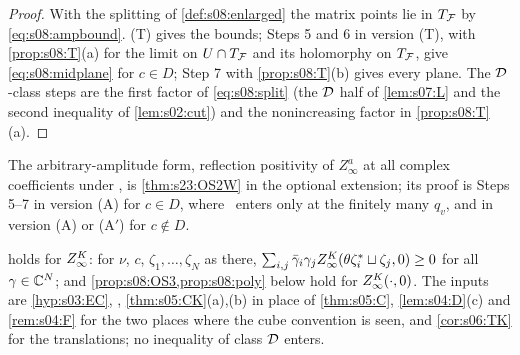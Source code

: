 \begin{proof}
With the splitting of \cref{def:s08:enlarged} the matrix points lie in $T_{\mathcal F}$ by \eqref{eq:s08:ampbound}. (T) gives the bounds; Steps 5 and 6 in version (T), with \cref{prop:s08:T}(a) for the limit on $U\cap T_{\mathcal F}$ and its holomorphy on $T_{\mathcal F}$, give \eqref{eq:s08:midplane} for $c\in D$; Step 7 with \cref{prop:s08:T}(b) gives every plane. The $\mathcal D$-class steps are the first factor of \eqref{eq:s08:split} (the $\mathcal D$ half of \cref{lem:s07:L} and the second inequality of \cref{lem:s02:cut}) and the nonincreasing factor in \cref{prop:s08:T}(a).
\end{proof}

The arbitrary-amplitude form, reflection positivity of $Z^a_\infty$ at all complex coefficients under \Wtwo, is \cref{thm:s23:OS2W} in the optional extension; its proof is Steps 5--7 in version (A) for $c\in D$, where \Wtwo\ enters only at the finitely many $q_v$, and in version (A) or (A$'$) for $c\notin D$.

\begin{lemma}\label{lem:s08:OS2K}
 holds for $Z^{K}_{\infty}$: for $\nu$, $c$, $\zeta_1,\dots,\zeta_N$ as there, $\sum_{i,j}\bar\gamma_i\gamma_jZ^{K}_{\infty}(\theta\zeta_i^*\sqcup\zeta_j,0)\ge0$ for all $\gamma\in\mathbb C^N$; and \cref{prop:s08:OS3,prop:s08:poly} below hold for $Z^{K}_{\infty}(\cdot,0)$. The inputs are \cref{hyp:s03:EC}, \cite[Thm.~6.2(1),(2)]{BFS1}, \cref{thm:s05:CK}(a),(b) in place of \cref{thm:s05:C}, \cref{lem:s04:D}(c) and \cref{rem:s04:F} for the two places where the cube convention is seen, and \cref{cor:s06:TK} for the translations; no inequality of class $\mathcal D$ enters.
\end{lemma}

